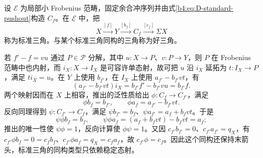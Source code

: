 \begin{definition}\label{b4:def:D-stable-standard-triangle}
	设 \(\mathcal E\) 为局部小 Frobenius 范畴，固定余合冲序列并由式\eqref{b4:eq:D-standard-pushout}构造 \(C_f\)。在 \(\underline{\mathcal E}\) 中，把
	\[
		X\xrightarrow{[f]}Y\xrightarrow{[b_f]}C_f\xrightarrow{[c_f]}\Sigma X
	\]
	称为标准三角。与某个标准三角同构的三角称为好三角。
\end{definition}

若 \(f'-f=vu\) 通过 \(P\in\mathcal P\) 分解，其中 \(u:X\to P\)、\(v:P\to Y\)，则 \(P\) 在 Frobenius 范畴中也内射，而 \(i_X:X\to I_X\) 是可容许单态射，故可把 \(u\) 沿 \(i_X\) 延拓为 \(t:I_X\to P\)，满足 \(ti_X=u\)。在 \(Y\) 上使用 \(b_{f'}\)，在 \(I_X\) 上使用 \(a_{f'}-b_{f'}vt\)，有
\[
	(a_{f'}-b_{f'}vt)i_X =b_{f'}f'-b_{f'}vu=b_{f'}f.
\]
两个映射因而在 \(X\) 上相容，推出的泛性质给出 \(\phi:C_f\to C_{f'}\)，满足
\[
	\phi b_f=b_{f'},\qquad \phi a_f=a_{f'}-b_{f'}vt.
\]
反向同理得到 \(\psi:C_{f'}\to C_f\)，满足 \(\psi b_{f'}=b_f\)、\(\psi a_{f'}=a_f+b_fvt\)。于是
\[
	\psi\phi b_f=b_f,\qquad \psi\phi a_f=(a_f+b_fvt)-b_fvt=a_f;
\]
推出的唯一性使 \(\psi\phi=1\)，反向计算使 \(\phi\psi=1\)。又因 \(c_{f'}b_{f'}=0\)、\(c_{f'}a_{f'}=q_X\)，有 \(c_{f'}\phi b_f=0=c_fb_f\)、\(c_{f'}\phi a_f=q_X=c_fa_f\)，故 \(c_{f'}\phi=c_f\)。因此这个同构还保持末箭头，标准三角的同构类型只依赖稳定态射。

